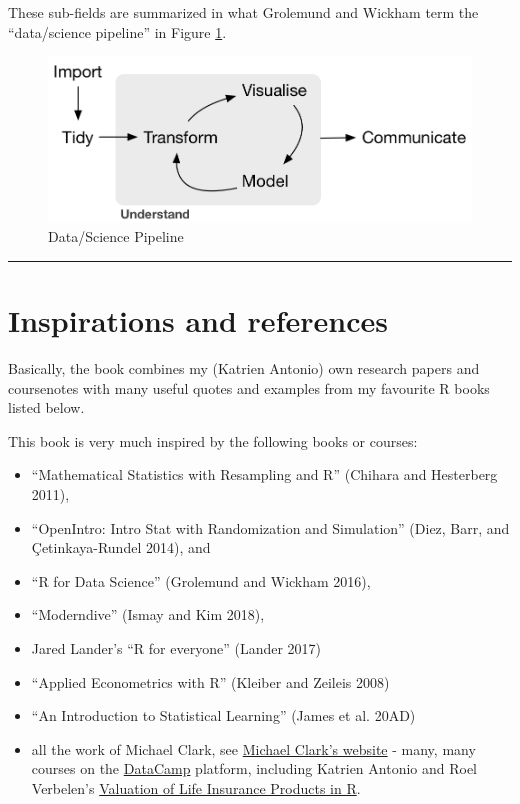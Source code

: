 \documentclass[
]{book}
\providecommand{\tightlist}{%
  \setlength{\itemsep}{0pt}\setlength{\parskip}{0pt}}
\begin{document}
These sub-fields are summarized in what Grolemund and Wickham term the ``data/science pipeline'' in Figure \ref{fig:pipeline-figure}.

\begin{figure}

{\centering \includegraphics[width=13.01in]{images/tidy1} 

}

\caption{Data/Science Pipeline}\label{fig:pipeline-figure}
\end{figure}

\begin{center}\rule{0.5\linewidth}{0.5pt}\end{center}

\hypertarget{inspirations-and-references}{%
\section{Inspirations and references}\label{inspirations-and-references}}

Basically, the book combines my (Katrien Antonio) own research papers and coursenotes with many useful quotes and examples from my favourite R books listed below.

This book is very much inspired by the following books or courses:

\begin{itemize}
\tightlist
\item
  ``Mathematical Statistics with Resampling and R'' (Chihara and Hesterberg 2011),
\item
  ``OpenIntro: Intro Stat with Randomization and Simulation'' (Diez, Barr, and Çetinkaya-Rundel 2014), and
\item
  ``R for Data Science'' (Grolemund and Wickham 2016),
\item
  ``Moderndive'' (Ismay and Kim 2018),
\item
  Jared Lander's ``R for everyone'' (Lander 2017)
\item
  ``Applied Econometrics with R'' (Kleiber and Zeileis 2008)
\item
  ``An Introduction to Statistical Learning'' (James et al. 20AD)
\item
  all the work of Michael Clark, see \href{http://m-clark.github.io/cv.html}{Michael Clark's website}
  - many, many courses on the \href{www.datacamp.com}{DataCamp} platform, including Katrien Antonio and Roel Verbelen's \href{https://www.datacamp.com/courses/2333}{Valuation of Life Insurance Products in R}.
\end{itemize}
\end{document}
